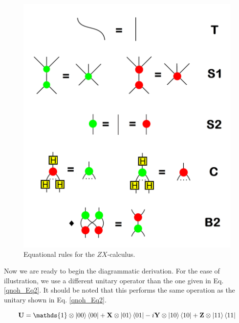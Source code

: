 \begin{figure}
\centering
\includegraphics[scale=.3]{qnoh_Fig8}
\caption{Equational rules for the $ZX$-calculus.}
\label{qnoh_Fig8}
\end{figure}

Now we are ready to begin the diagrammatic derivation. For the ease of illustration, we use a different unitary operator than the one given in Eq. \eqref{qnoh_Eq2}. It should be noted that this performs the same operation as the unitary shown in Eq. \eqref{qnoh_Eq2}.

\begin{equation}\label{qnoh_Eq6}
    \mathbf{U} =  \mathds{1} \otimes \ket{00}\bra{00} + \mathbf{X} \otimes \ket{01}\bra{01} - i \mathbf{Y}\otimes \ket{10}\bra{10}+\mathbf{Z}\otimes \ket{11}\bra{11}
\end{equation}

